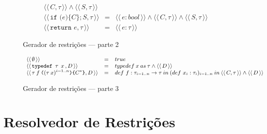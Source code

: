 \documentclass[a4paper,8pt]{article}
\newcommand{\constr}[1]{\ensuremath{\langle\langle\,#1\,\rangle\rangle}}
\begin{document}
\begin{figure}[h]
\[{\begin{array}{lcl}
                                                     \constr{C
                                                            , \tau}
                                                                \land \constr{S,\tau}\\
             \constr{\texttt{if (} e \texttt{)\{} C
             \texttt{\}} ; S , \tau} & = & \constr{e : bool}
                                                     \land
                                                     \constr{C
                                       , \tau} \land \constr{S,\tau}\\
             \constr{\texttt{return }e, \tau} & = & \constr{e : \tau}
           \end{array}}
       \]
       \caption{Gerador de restrições --- parte 2}
     \end{figure}

     \begin{figure}[h]
       \[
         \small{
           \begin{array}{lcl}
               \constr{\emptyset} & = & true \\
               \constr{\texttt{typedef }\tau\:\:x\,,D} & = &
                                                             typedef\:x
                                                             \:as\:\tau
                                                             \land \constr{D}\\
               \constr{\tau\:f\:\texttt{(}(\tau\:x)^{i=1..n}\texttt{)}
             \texttt{\{}C^*\texttt{\}} , D} & = & def\,\,f :
                                                       \tau_{i =
                                                       1.. n}\to \tau
                                                       \:in\: 
                                                       (def\,\,x_i :
                                                       \tau_i)_{i
                                                       = 1..n}\: in\:
                                                       \constr{C,\tau}
                                                       \land \constr{D}
           \end{array}
         }
       \]
       \caption{Gerador de restrições --- parte 3}
     \end{figure}
     
     \section{Resolvedor de Restrições}\label{constraintsolver}
\end{document}
